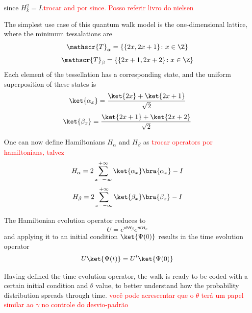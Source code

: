             	since $H_k^2 = I$.\textcolor{red}{trocar and por since. Posso referir livro do nielsen}\par
            	The simplest use case of this quantum walk model is the one-dimensional lattice, where the minimum tessalations are
            	\begin{equation}
            	    \mathscr{T}_{\alpha}= \{\{2x,2x+1\}\colon x \in \Z\}
            	\end{equation}
            	\begin{equation}
            	    \mathscr{T}_{\beta}= \{\{2x+1,2x+2\}\colon x \in \Z\}
            	\end{equation}
            	 Each element of the tessellation has a corresponding state, and the uniform superposition of these states is
            	\begin{equation}
            	    \ket{\alpha_x} = \frac{\ket{2x} + \ket{2x+1}}{\sqrt{2}}
            	\end{equation}
            	\begin{equation}
            	    \ket{\beta_x} = \frac{\ket{2x+1}+\ket{2x+2}}{\sqrt{2}}
            	\end{equation}\par
            	One can now define Hamiltonians $H_\alpha$ and $H_\beta$ as \textcolor{red}{trocar operators por hamiltonians, talvez} 
            	\begin{equation}
            	    H_\alpha = 2\sum_{x=-\infty}^{+\infty}\ket{\alpha_{x}}\bra{\alpha_x} - I
            	\end{equation}
            	\begin{equation}
            	    H_\beta = 2\sum_{x=-\infty}^{+\infty}\ket{\beta_{x}}\bra{\beta_x} - I
            	\end{equation}\par
            	The Hamiltonian evolution operator reduces to
            	\begin{equation}
            	    U = e^{i\theta H_\beta}e^{i\theta H_\alpha}
            	\end{equation}
                and applying it to an initial condition $\ket{\Psi(0)}$ results in the time evolution operator
                \begin{equation}
                    U\ket{\Psi(t)} = U^t\ket{\Psi(0)}
                \end{equation}\par
                Having defined the time evolution operator, the walk is ready to be coded with a certain initial condition and $\theta$ value, to better understand how the probability distribution spreads through time. \textcolor{red}{você pode acrescentar que o $\theta$ terá um papel similar ao $\gamma$ no controle do desvio-padrão}
                
